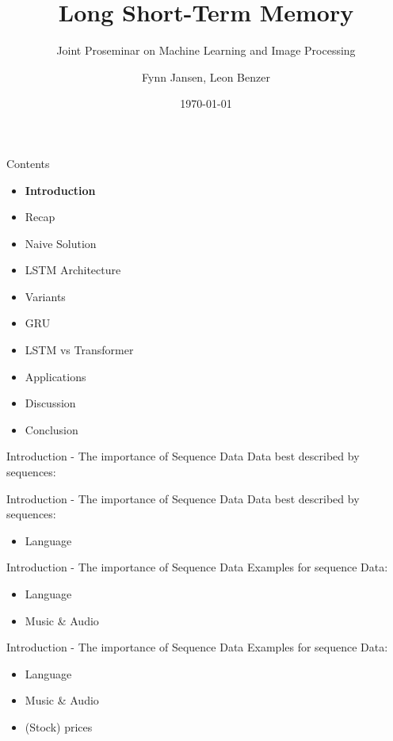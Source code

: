 \documentclass[10pt, aspectratio=169]{beamer}
\title{Long Short-Term Memory}
\subtitle{Joint Proseminar on Machine Learning and Image Processing}
\date{\today}
\author{Fynn Jansen, Leon Benzer}
\institute{Chair of Computer Science 13 (Computer Vision)\\RWTH Aachen}
\begin{document}
\maketitle


\begin{frame}[t]{Contents}
\begin{itemize}
    \item \textbf{Introduction}
    \item Recap
    \item Naive Solution
    \item LSTM Architecture
    \item Variants
    \item GRU
    \item LSTM vs Transformer
    \item Applications
    \item Discussion
    \item Conclusion
\end{itemize}
\end{frame}

\begin{frame}[t]{Introduction - The importance of Sequence Data}
Data best described by sequences:
\end{frame}

\begin{frame}[t]{Introduction - The importance of Sequence Data}
Data best described by sequences:
\begin{itemize}
    \item Language
\end{itemize}
\end{frame}

\begin{frame}[t]{Introduction - The importance of Sequence Data}
Examples for sequence Data:
\begin{itemize}
    \item Language
    \item Music \& Audio
\end{itemize}
\end{frame}

\begin{frame}[t]{Introduction - The importance of Sequence Data}
Examples for sequence Data:
\begin{itemize}
    \item Language
    \item Music \& Audio
    \item (Stock) prices
\end{itemize}
\end{frame}
\end{document}
